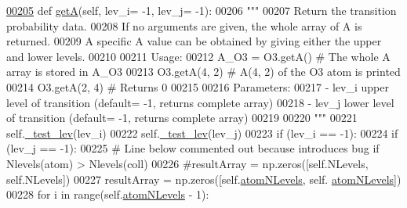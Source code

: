 \begin{DoxyCode}
\hypertarget{classpyneb_1_1core_1_1pynebcore_1_1___atom_data_fits_l00205}{}\hyperlink{classpyneb_1_1core_1_1pynebcore_1_1___atom_data_fits_a4ecca5287d3b6bf0d6e44b9bb184db77}{00205}     \textcolor{keyword}{def }\hyperlink{classpyneb_1_1core_1_1pynebcore_1_1___atom_data_fits_a4ecca5287d3b6bf0d6e44b9bb184db77}{getA}(self, lev\_i= -1, lev\_j= -1):
00206         \textcolor{stringliteral}{"""}
00207 \textcolor{stringliteral}{        Return the transition probability data. }
00208 \textcolor{stringliteral}{        If no arguments are given, the whole array of A is returned.}
00209 \textcolor{stringliteral}{        A specific A value can be obtained by giving either the upper and lower levels.}
00210 \textcolor{stringliteral}{            }
00211 \textcolor{stringliteral}{        Usage:}
00212 \textcolor{stringliteral}{            A\_O3 = O3.getA()          # The whole A array is stored in A\_O3}
00213 \textcolor{stringliteral}{            O3.getA(4, 2)      # A(4, 2) of the O3 atom is printed}
00214 \textcolor{stringliteral}{            O3.getA(2, 4)      # Returns 0}
00215 \textcolor{stringliteral}{}
00216 \textcolor{stringliteral}{        Parameters:}
00217 \textcolor{stringliteral}{            - lev\_i  upper level of transition (default= -1, returns complete array)}
00218 \textcolor{stringliteral}{            - lev\_j  lower level of transition (default= -1, returns complete array)}
00219 \textcolor{stringliteral}{            }
00220 \textcolor{stringliteral}{        """}
00221         self.\hyperlink{classpyneb_1_1core_1_1pynebcore_1_1___atom_data_fits_ae83c63a7bd651275de23e5f17ddcf999}{\_test\_lev}(lev\_i)
00222         self.\hyperlink{classpyneb_1_1core_1_1pynebcore_1_1___atom_data_fits_ae83c63a7bd651275de23e5f17ddcf999}{\_test\_lev}(lev\_j)
00223         \textcolor{keywordflow}{if} (lev\_i == -1):
00224             \textcolor{keywordflow}{if} (lev\_j == -1):
00225                 \textcolor{comment}{# Line below commented out because introduces bug if Nlevels(atom) > Nlevels(coll)}
00226                 \textcolor{comment}{#resultArray = np.zeros([self.NLevels, self.NLevels])}
00227                 resultArray = np.zeros([self.\hyperlink{classpyneb_1_1core_1_1pynebcore_1_1___atom_data_fits_a4ff73bfa251e1139692c2a60f9821315}{atomNLevels}, self.
      \hyperlink{classpyneb_1_1core_1_1pynebcore_1_1___atom_data_fits_a4ff73bfa251e1139692c2a60f9821315}{atomNLevels}])
00228                 \textcolor{keywordflow}{for} i \textcolor{keywordflow}{in} range(self.\hyperlink{classpyneb_1_1core_1_1pynebcore_1_1___atom_data_fits_a4ff73bfa251e1139692c2a60f9821315}{atomNLevels} - 1):

\end{DoxyCode}

